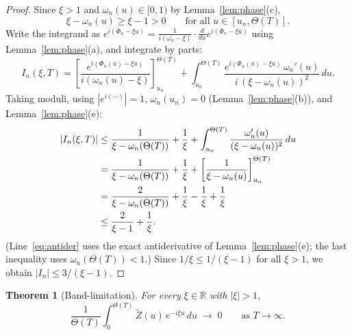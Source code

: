 \documentclass[12pt]{amsart}
\newtheorem{theorem}{Theorem}[section]
\theoremstyle{definition}
\theoremstyle{remark}
\newcommand{\R}{\mathbb{R}}
\newcommand{\Th}{\Theta}
\newcommand{\Zt}{\widetilde{Z}}
\begin{document}
\begin{proof}
Since $\xi>1$ and $\omega_n(u)\in[0,1)$ by Lemma~\ref{lem:phase}(c),
\begin{equation}\label{eq:gap}
  \xi - \omega_n(u) \ge \xi-1 > 0
  \qquad\text{for all }u\in[u_n,\Th(T)].
\end{equation}
Write the integrand as
$e^{i(\Phi_n-\xi u)} = \frac{1}{i(\omega_n-\xi)}\cdot
\frac{d}{du}e^{i(\Phi_n-\xi u)}$
using Lemma~\ref{lem:phase}(a), and integrate by parts:
\begin{equation}\label{eq:IBP}
  I_n(\xi,T)
  = \left[\frac{e^{i(\Phi_n(u)-\xi u)}}{i(\omega_n(u)-\xi)}\right]_{u_n}^{\Th(T)}
  + \int_{u_n}^{\Th(T)}
    \frac{e^{i(\Phi_n(u)-\xi u)}\,\omega_n'(u)}{i\,(\xi-\omega_n(u))^2}\,du.
\end{equation}
Taking moduli, using $|e^{i(\cdots)}|=1$, $\omega_n(u_n)=0$
(Lemma~\ref{lem:phase}(b)), and Lemma~\ref{lem:phase}(e):
\begin{align}
|I_n(\xi,T)|
&\le \frac{1}{\xi-\omega_n(\Th(T))} + \frac{1}{\xi}
   + \int_{u_n}^{\Th(T)}\frac{\omega_n'(u)}{(\xi-\omega_n(u))^2}\,du
   \notag\\
&= \frac{1}{\xi-\omega_n(\Th(T))} + \frac{1}{\xi}
   + \left[\frac{1}{\xi-\omega_n(u)}\right]_{u_n}^{\Th(T)}
   \label{eq:antider}\\
&= \frac{2}{\xi-\omega_n(\Th(T))} + \frac{1}{\xi} - \frac{1}{\xi}
   +\frac{1}{\xi}
   \notag\\
&\le \frac{2}{\xi-1} + \frac{1}{\xi}. \notag
\end{align}
(Line~\eqref{eq:antider} uses the exact antiderivative of
Lemma~\ref{lem:phase}(e); the last inequality uses
$\omega_n(\Th(T))<1$.)
Since $1/\xi\le 1/(\xi-1)$ for all $\xi>1$, we obtain
$|I_n|\le 3/(\xi-1)$.
\end{proof}

\begin{theorem}[Band-limitation]\label{thm:main}
For every $\xi\in\R$ with $|\xi|>1$,
\begin{equation}\label{eq:main}
  \frac{1}{\Th(T)}\int_0^{\Th(T)}\Zt(u)\,e^{-i\xi u}\,du
  \;\longrightarrow\; 0
  \qquad\text{as }T\to\infty.
\end{equation}
\end{theorem}
\end{document}

